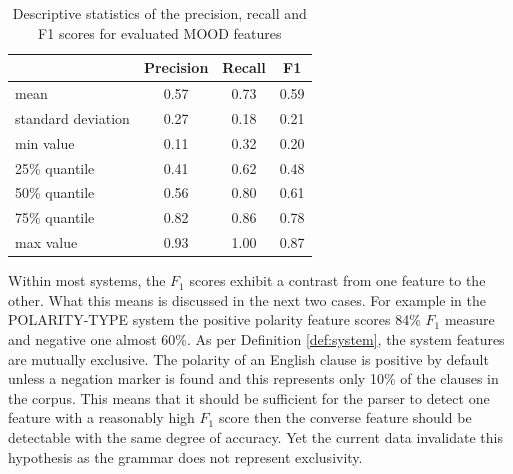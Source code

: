     \begin{table}[!ht]
        \centering
        \begin{tabular}{lccc}
            \toprule
            {} & {Precision} & {Recall} & {F1} \\ %
            \midrule
            mean & 0.57 & 0.73 & 0.59 \\ 
            standard deviation & 0.27 & 0.18 & 0.21 \\ 
            min value & 0.11 & 0.32 & 0.20 \\ %
            25\% quantile & 0.41 & 0.62 & 0.48 \\ %
            50\% quantile & 0.56 & 0.80 & 0.61 \\ %
            75\% quantile & 0.82 & 0.86 & 0.78 \\ %
            max value & 0.93 & 1.00 & 0.87 \\ %
            \bottomrule
        \end{tabular}
        \caption{Descriptive statistics of the precision, recall and F1 scores for evaluated MOOD features}
        \label{tab:mood-accuracy}
    \end{table}

    Within most systems, the $F_1$ scores exhibit a contrast from one feature to the other. What this means is discussed in the next two cases. For example in the POLARITY-TYPE system the positive polarity feature scores 84\% $F_1$ measure and negative one almost 60\%. As per Definition \ref{def:system}, the system features are mutually exclusive. The polarity of an English clause is positive by default unless a negation marker is found and this represents only 10\% of the clauses in  the corpus. This means that it should be sufficient for the parser to detect one feature with a reasonably high $F_1$ score then the converse feature should be detectable with the same degree of accuracy. Yet the current data invalidate this hypothesis as the grammar does not represent exclusivity.
    
